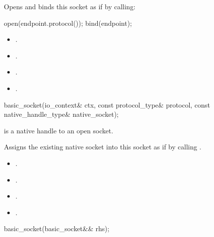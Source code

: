 \begin{itemdescr}
\pnum
\effects Opens and binds this socket as if by calling: 
\begin{codeblock}
open(endpoint.protocol());
bind(endpoint);
\end{codeblock}


\pnum
\postconditions 
\begin{itemize}
\item
{}.
\item
{}.
\item
{}.
\item
{}.
\end{itemize}
\end{itemdescr}

\begin{itemdecl}
basic_socket(io_context& ctx, const protocol_type& protocol,
             const native_handle_type& native_socket);
\end{itemdecl}

\begin{itemdescr}
\pnum
\requires {} is a native handle to an open socket.

\pnum
\effects Assigns the existing native socket into this socket as if by calling .

\pnum
\postconditions 
\begin{itemize}
\item
{}.
\item
{}.
\item
{}.
\item
{}.
\end{itemize}
\end{itemdescr}

\begin{itemdecl}
basic_socket(basic_socket&& rhs);
\end{itemdecl}

